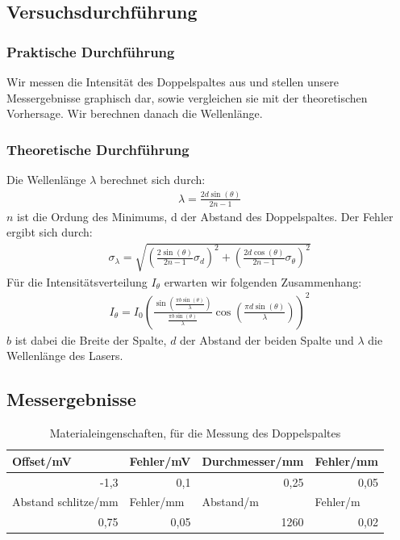 \documentclass[12pt]{scrartcl}
\begin{document}
\subsection{Versuchsdurchführung}

\subsubsection{Praktische Durchführung}
Wir messen die Intensität des Doppelspaltes aus und stellen unsere Messergebnisse graphisch dar, sowie vergleichen sie mit der theoretischen Vorhersage. Wir berechnen danach die Wellenlänge.
\subsubsection{Theoretische Durchführung}
Die Wellenlänge $\lambda$ berechnet sich durch:
\begin{align}
\lambda = \frac{2d \sin(\theta)}{2n-1}
\label{eqn:lambda_2}
\end{align}
$n$ ist die Ordung des Minimums, d der Abstand des Doppelspaltes.
Der Fehler ergibt sich durch:
\begin{align}
\sigma_\lambda = \sqrt{
\left(\frac{2 \sin(\theta)}{2n-1}\sigma_d\right)^2+
\left(\frac{2d \cos(\theta)}{2n-1}\sigma_\theta\right)^2}
\label{eqn:lambda_2_sigma}
\end{align}
Für die Intensitätsverteilung $I_\theta$ erwarten wir folgenden Zusammenhang:
\begin{align}
I_\theta = I_0\left(\frac{\sin\left(\frac{\pi b \sin(\theta)}{\lambda}\right)}{\frac{\pi b \sin(\theta)}{\lambda}}\cos\left(\frac{\pi d\sin(\theta)}{\lambda}\right)\right)^2
\end{align}
$b$ ist dabei die Breite der Spalte, $d$ der Abstand der beiden Spalte und $\lambda$ die Wellenlänge des Lasers.

\subsection{Messergebnisse}

\begin{table}[H]
\caption{Materialeingenschaften, für die Messung des Doppelspaltes}
\begin{center}
\begin{tabular}{|l|l|l|l|}
\hline
Offset/mV & Fehler/mV & Durchmesser/mm & Fehler/mm \\ \hline
\multicolumn{1}{|r|}{-1,3} & \multicolumn{1}{|r|}{0,1} & \multicolumn{1}{r|}{0,25} & \multicolumn{1}{r|}{0,05} \\ \hline
Abstand schlitze/mm & Fehler/mm & Abstand/m & Fehler/m \\ \hline
\multicolumn{1}{|r|}{0,75} & \multicolumn{1}{r|}{0,05} & \multicolumn{1}{r|}{1260} & \multicolumn{1}{r|}{0,02} \\ \hline
\end{tabular}
\end{center}
\label{tab:a_3_e}
\end{table}
\end{document}
